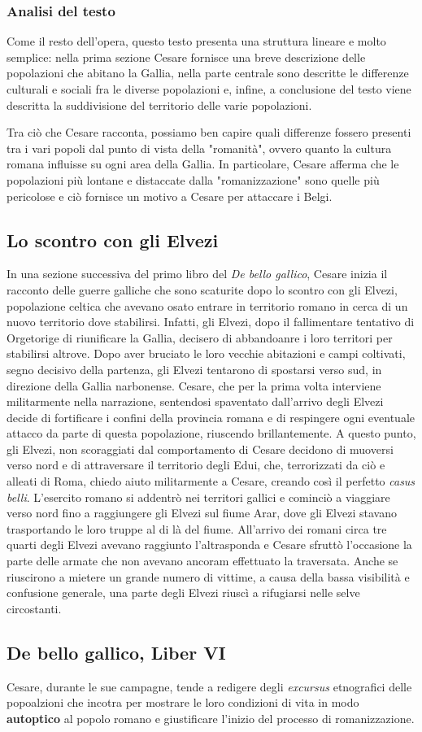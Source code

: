 \documentclass[10pt,a4paper]{article}
\begin{document}
	\subsubsection{Analisi del testo}

	Come il resto dell'opera, questo testo presenta una struttura lineare e molto semplice: nella prima sezione Cesare fornisce una breve descrizione delle popolazioni che abitano la Gallia, nella parte centrale sono descritte le differenze culturali e sociali fra le diverse popolazioni e, infine, a conclusione del testo viene descritta la suddivisione del territorio delle varie popolazioni.

	Tra ciò che Cesare racconta, possiamo ben capire quali differenze fossero presenti tra i vari popoli dal punto di vista della "romanità", ovvero quanto la cultura romana influisse su ogni area della Gallia. In particolare, Cesare afferma che le popolazioni più lontane e distaccate dalla "romanizzazione" sono quelle più pericolose e ciò fornisce un motivo a Cesare per attaccare i Belgi.

	\subsection{Lo scontro con gli Elvezi}

	In una sezione successiva del primo libro del \textit{De bello gallico}, Cesare inizia il racconto delle guerre galliche che sono scaturite dopo lo scontro con gli Elvezi, popolazione celtica che avevano osato entrare in territorio romano in cerca di un nuovo territorio dove stabilirsi. Infatti, gli Elvezi, dopo il fallimentare tentativo di Orgetorige di riunificare la Gallia, decisero di abbandoanre i loro territori per stabilirsi altrove. Dopo aver bruciato le loro vecchie abitazioni e campi coltivati, segno decisivo della partenza, gli Elvezi tentarono di spostarsi verso sud, in direzione della Gallia narbonense. Cesare, che per la prima volta interviene militarmente nella narrazione, sentendosi spaventato dall'arrivo degli Elvezi decide di fortificare i confini della provincia romana e di respingere ogni eventuale attacco da parte di questa popolazione, riuscendo brillantemente. A questo punto, gli Elvezi, non scoraggiati dal comportamento di Cesare decidono di muoversi verso nord e di attraversare il territorio degli Edui, che, terrorizzati da ciò e alleati di Roma, chiedo aiuto militarmente a Cesare, creando così il perfetto \textit{casus belli}. L'esercito romano si addentrò nei territori gallici e cominciò a viaggiare verso nord fino a raggiungere gli Elvezi sul fiume Arar, dove gli Elvezi stavano trasportando le loro truppe al di là del fiume. All'arrivo dei romani circa tre quarti degli Elvezi avevano raggiunto l'altrasponda e Cesare sfruttò l'occasione la parte delle armate che non avevano ancoram effettuato la traversata. Anche se riuscirono a mietere un grande numero di vittime, a causa della bassa visibilità e confusione generale, una parte degli Elvezi riuscì a rifugiarsi nelle selve circostanti.

	\subsection{De bello gallico, Liber VI}

	Cesare, durante le sue campagne, tende a redigere degli \textit{excursus} etnografici delle popoalzioni che incotra per mostrare le loro condizioni di vita in modo \textbf{autoptico} al popolo romano e giustificare l'inizio del processo di romanizzazione.
\end{document}
